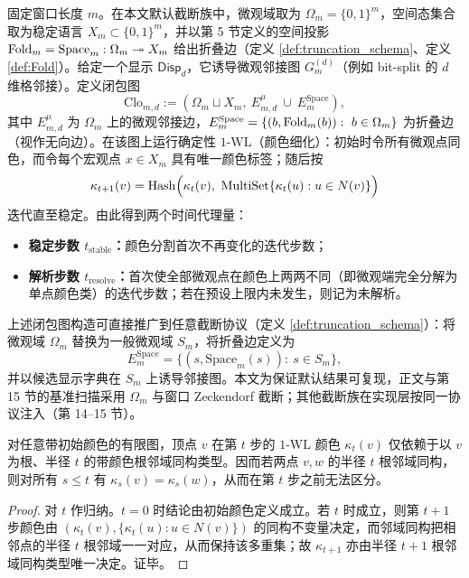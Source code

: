 \AuditTag 固定窗口长度 $m$。在本文默认截断族中，微观域取为 $\Omega_m=\{0,1\}^m$，空间态集合取为稳定语言 $X_m\subset\{0,1\}^m$，并以第 5 节定义的空间投影 $\mathrm{Fold}_m=\mathrm{Space}_m:\Omega_m\twoheadrightarrow X_m$ 给出折叠边（定义 \ref{def:truncation_schema}、定义 \ref{def:Fold}）。给定一个显示 $\mathsf{Disp}_d$，它诱导微观邻接图 $G^{(d)}_m$（例如 bit-split 的 $d$ 维格邻接）。定义闭包图
$$
\mathrm{Clo}_{m,d}:=(\Omega_m\sqcup X_m,\ E^{\mu}_{m,d}\ \cup\ E^{\mathrm{Space}}_m),
$$
其中 $E^{\mu}_{m,d}$ 为 $\Omega_m$ 上的微观邻接边，$E^{\mathrm{Space}}_m=\{(b,\Fold_m(b)):\ b\in\Omega_m\}$ 为折叠边（视作无向边）。在该图上运行确定性 $1\text{-}\mathrm{WL}$（颜色细化）：初始时令所有微观点同色，而令每个宏观点 $x\in X_m$ 具有唯一颜色标签；随后按
$$
\kappa_{t+1}(v)=\mathrm{Hash}\Bigl(\kappa_t(v),\ \mathrm{MultiSet}\{\kappa_t(u):u\in N(v)\}\Bigr)
$$
迭代直至稳定。由此得到两个时间代理量：
\begin{itemize}
  \item \textbf{稳定步数 $t_{\mathrm{stable}}$：}颜色分割首次不再变化的迭代步数；
  \item \textbf{解析步数 $t_{\mathrm{resolve}}$：}首次使全部微观点在颜色上两两不同（即微观端完全分解为单点颜色类）的迭代步数；若在预设上限内未发生，则记为未解析。
\end{itemize}

\begin{remark}[对多种截断族的泛化]\label{rem:closure_graph_general_truncation}
\AuditTag
上述闭包图构造可直接推广到任意截断协议（定义 \ref{def:truncation_schema}）：将微观域 $\Omega_m$ 替换为一般微观域 $S_m$，将折叠边定义为
$$
E^{\mathrm{Space}}_m=\{(s,\mathrm{Space}_m(s)):\ s\in S_m\},
$$
并以候选显示字典在 $S_m$ 上诱导邻接图。本文为保证默认结果可复现，正文与第 15 节的基准扫描采用 $\Omega_m$ 与窗口 Zeckendorf 截断；其他截断族在实现层按同一协议注入（第 14--15 节）。
\end{remark}

\begin{lemma}\label{lem:wl_locality}
\MathTag
对任意带初始颜色的有限图，顶点 $v$ 在第 $t$ 步的 $1\text{-}\mathrm{WL}$ 颜色 $\kappa_t(v)$ 仅依赖于以 $v$ 为根、半径 $t$ 的带颜色根邻域同构类型。因而若两点 $v,w$ 的半径 $t$ 根邻域同构，则对所有 $s\le t$ 有 $\kappa_s(v)=\kappa_s(w)$，从而在第 $t$ 步之前无法区分。
\end{lemma}

\begin{proof}
\MathTag
对 $t$ 作归纳。$t=0$ 时结论由初始颜色定义成立。若 $t$ 时成立，则第 $t+1$ 步颜色由 $(\kappa_t(v),\{\kappa_t(u):u\in N(v)\})$ 的同构不变量决定，而邻域同构把相邻点的半径 $t$ 根邻域一一对应，从而保持该多重集；故 $\kappa_{t+1}$ 亦由半径 $t+1$ 根邻域同构类型唯一决定。证毕。
\end{proof}

